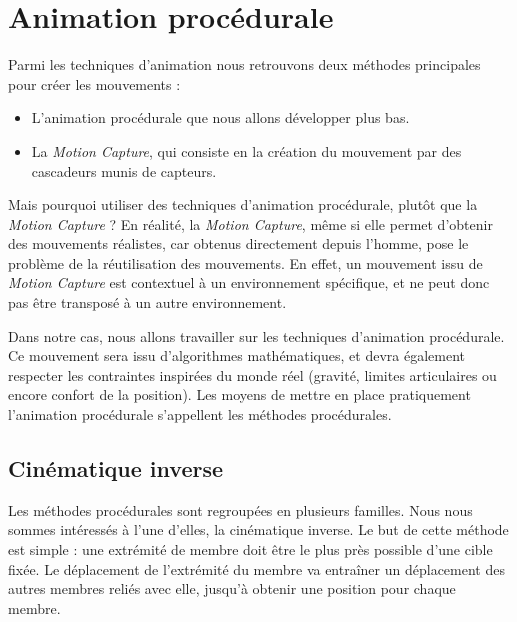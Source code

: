 \documentclass[a4paper,11pt]{article}
\begin{document}
\section{Animation procédurale}  
Parmi les techniques d'animation nous retrouvons deux méthodes principales pour créer les mouvements : 
\begin{itemize}
	\item L'animation procédurale que nous allons développer plus bas.
	\item La \textit{Motion Capture}, qui consiste en la création du mouvement par des cascadeurs munis de capteurs. 
\end{itemize}
Mais pourquoi utiliser des techniques d'animation procédurale, plutôt que la \textit{Motion Capture} ? En réalité, la \textit{Motion Capture}, même si elle permet d'obtenir des mouvements réalistes, car obtenus directement depuis l'homme, pose le problème de la réutilisation des mouvements. En effet, un mouvement issu de \textit{Motion Capture} est contextuel à un environnement spécifique, et ne peut donc pas être transposé à un autre environnement.

Dans notre cas, nous allons travailler sur les techniques d'animation procédurale. Ce mouvement sera issu d'algorithmes mathématiques, et devra également respecter les contraintes inspirées du monde réel (gravité, limites articulaires ou encore confort de la position). Les moyens de mettre en place pratiquement l'animation procédurale s'appellent les méthodes procédurales.

\subsection{Cinématique inverse}
Les méthodes procédurales sont regroupées en plusieurs familles. Nous nous sommes intéressés à l'une d'elles, la cinématique inverse. Le but de cette méthode est simple : une extrémité de membre doit être le plus près possible d'une cible fixée. Le déplacement de l'extrémité du membre va entraîner un déplacement des autres membres reliés avec elle, jusqu'à obtenir une position pour chaque membre.

\end{document}
